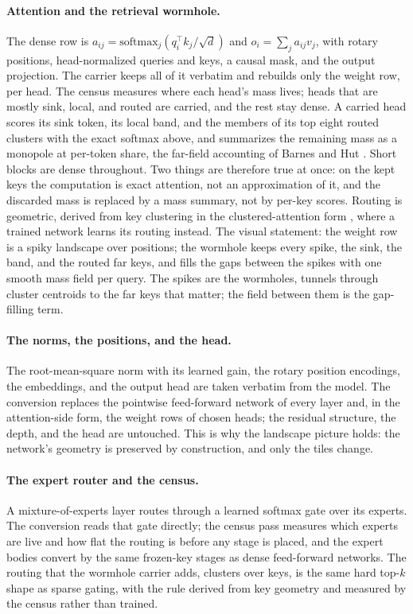 \documentclass[11pt]{article}
\begin{document}
\paragraph{Attention and the retrieval wormhole.}
The dense row is
$a_{ij} = \mathrm{softmax}_j(q_i^{\top} k_j / \sqrt{d})$ and
$o_i = \sum_j a_{ij} v_j$, with rotary positions, head-normalized
queries and keys, a causal mask, and the output projection. The
carrier keeps all of it verbatim and rebuilds only the weight
row, per head. The census measures where each head's mass lives;
heads that are mostly sink, local, and routed are carried, and
the rest stay dense. A carried head scores its sink token, its
local band, and the members of its top eight routed clusters with
the exact softmax above, and summarizes the remaining mass as a
monopole at per-token share, the far-field accounting of Barnes
and Hut \cite{barnes1986}. Short blocks are dense throughout.
Two things are therefore true at once: on the kept keys the
computation is exact attention, not an approximation of it, and
the discarded mass is replaced by a mass summary, not by
per-key scores. Routing is geometric, derived from key
clustering \cite{arthur2007} in the clustered-attention form
\cite{vyas2020clustered}, where a trained network learns its
routing instead. The visual statement: the weight row is a spiky
landscape over positions; the wormhole keeps every spike, the
sink, the band, and the routed far keys, and fills the gaps
between the spikes with one smooth mass field per query. The
spikes are the wormholes, tunnels through cluster centroids to
the far keys that matter; the field between them is the
gap-filling term.

\paragraph{The norms, the positions, and the head.}
The root-mean-square norm with its learned gain, the rotary
position encodings, the embeddings, and the output head are taken
verbatim from the model. The conversion replaces the pointwise
feed-forward network of every layer and, in the attention-side
form, the weight rows of chosen heads; the residual structure,
the depth, and the head are untouched. This is why the landscape
picture holds: the network's geometry is preserved by
construction, and only the tiles change.

\paragraph{The expert router and the census.}
A mixture-of-experts layer routes through a learned softmax gate
over its experts. The conversion reads that gate directly; the
census pass measures which experts are live and how flat the
routing is before any stage is placed, and the expert bodies
convert by the same frozen-key stages as dense feed-forward
networks. The routing that the wormhole carrier adds, clusters
over keys, is the same hard top-$k$ shape as sparse gating, with
the rule derived from key geometry and measured by the census
rather than trained.
\end{document}
